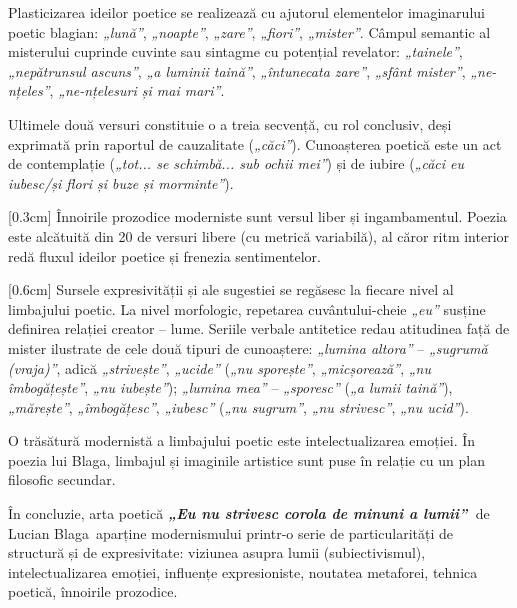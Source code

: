 \documentclass[
12pt,                        %
a4paper                      %
]{article}
\newcommand{\operatitle}{\textbf{\textit{„Eu nu strivesc corola de minuni a lumii”\ }}} %
\newcommand{\operaauthor}{Lucian Blaga\ } %
\begin{document}
Plasticizarea ideilor poetice se realizează cu ajutorul elementelor imaginarului poetic blagian: \textit{„lună”}, \textit{„noapte”}, \textit{„zare”}, \textit{„fiori”}, \textit{„mister”}. Câmpul semantic al misterului cuprinde cuvinte sau sintagme cu potențial revelator: \textit{„tainele”}, \textit{„nepătrunsul ascuns”}, \textit{„a luminii taină”}, \textit{„întunecata zare”}, \textit{„sfânt mister”}, \textit{„ne-nțeles”}, \textit{„ne-nțelesuri și mai mari”}.

Ultimele două versuri constituie o a treia secvență, cu rol conclusiv, deși exprimată prin raportul de cauzalitate (\textit{„căci”}). Cunoașterea poetică este un act de contemplație (\textit{„tot... se schimbă... sub ochii mei”}) și de iubire (\textit{„căci eu iubesc/și flori și buze și morminte”}).

[0.3cm]
Înnoirile prozodice moderniste sunt versul liber și ingambamentul. Poezia este alcătuită din 20 de versuri libere (cu metrică variabilă), al căror ritm interior redă fluxul ideilor poetice și frenezia sentimentelor.

[0.6cm]
Sursele expresivității și ale sugestiei se regăsesc la fiecare nivel al limbajului poetic. La nivel morfologic, repetarea cuvântului-cheie \textit{„eu”} susține definirea relației creator -- lume. Seriile verbale antitetice redau atitudinea față de mister ilustrate de cele două tipuri de cunoaștere: \textit{„lumina altora”} -- \textit{„sugrumă (vraja)”}, adică \textit{„strivește”}, \textit{„ucide”} (\textit{„nu sporește”}, \textit{„micșorează”}, \textit{„nu îmbogățește”}, \textit{„nu iubește”}); \textit{„lumina mea”} -- \textit{„sporesc”} (\textit{„a lumii taină”}), \textit{„mărește”}, \textit{„îmbogățesc”}, \textit{„iubesc”} (\textit{„nu sugrum”}, \textit{„nu strivesc”}, \textit{„nu ucid”}).

O trăsătură modernistă a limbajului poetic este intelectualizarea emoției. În poezia lui Blaga, limbajul și imaginile artistice sunt puse în relație cu un plan filosofic secundar.

În concluzie, arta poetică \operatitle de \operaauthor aparține modernismului printr-o serie de particularități de structură și de expresivitate: viziunea asupra lumii (subiectivismul), intelectualizarea emoției, influențe expresioniste, noutatea metaforei, tehnica poetică, înnoirile prozodice.
\end{document}
